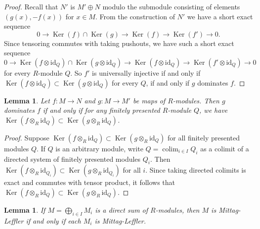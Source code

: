 \documentclass{amsart}
\theoremstyle{plain}
\newtheorem{lemma}[subsection]{Lemma}
\theoremstyle{definition}
\theoremstyle{remark}
\numberwithin{equation}{subsection}
\def\colim{\mathop{\mathrm{colim}}\nolimits}
\def\Ker{\mathop{\mathrm{Ker}}}
\begin{document}
\begin{proof}
Recall that $N'$ is $M' \oplus N$ modulo the submodule consisting of elements
$(g(x), -f(x))$ for $x \in M$.
From the construction of $N'$ we have a short exact sequence
$$
0 \to \Ker(f) \cap \Ker(g) \to \Ker(f) \to \Ker(f')
\to 0.
$$
Since tensoring commutes with taking pushouts, we have such a short exact
sequence
$$
0 \to \Ker(f \otimes \text{id}_Q ) \cap \Ker(g \otimes
\text{id}_Q) \to \Ker(f \otimes \text{id}_Q)
\to \Ker(f' \otimes \text{id}_Q) \to 0
$$
for every $R$-module $Q$.  So $f'$ is universally injective if and only if
$\Ker(f \otimes \text{id}_Q ) \subset \Ker(g \otimes
\text{id}_Q)$ for every $Q$, if and only if $g$ dominates $f$.
\end{proof}


\begin{lemma}
\label{lemma-domination-fp}
Let $f: M \to N$ and $g: M \to M'$ be maps of $R$-modules.
Then $g$ dominates $f$ if and only if for any finitely presented $R$-module
$Q$, we have $\Ker(f \otimes_R \text{id}_Q) \subset \Ker(g \otimes_R
\text{id}_Q)$.
\end{lemma}

\begin{proof}
Suppose $\Ker(f \otimes_R \text{id}_Q) \subset \Ker(g \otimes_R
\text{id}_Q)$ for all finitely presented modules $Q$.  If $Q$ is an
arbitrary module, write $Q = \colim_{i \in I} Q_i$ as a colimit of a
directed
system of finitely presented modules $Q_i$.  Then $\Ker(f \otimes_R
\text{id}_{Q_i}) \subset \Ker(g \otimes_R \text{id}_{Q_i})$ for
all $i$.  Since taking directed colimits is exact and commutes with tensor
product, it follows that $\Ker(f \otimes_R \text{id}_Q) \subset \Ker(g
\otimes_R \text{id}_Q)$.
\end{proof}


\begin{lemma}
\label{lemma-direct-sum-ML}
If $M = \bigoplus_{i \in I} M_i$ is a direct sum of $R$-modules, then $M$ is
Mittag-Leffler if and only if each $M_i$ is Mittag-Leffler.
\end{lemma}
\end{document}
